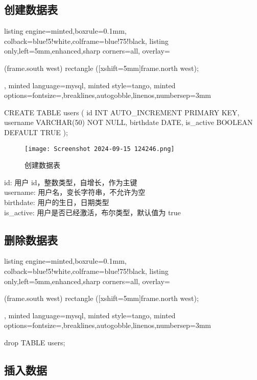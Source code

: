 \documentclass[12pt]{article}
\begin{document}
\subsection{创建数据表}
\begin{tcblisting}{listing engine=minted,boxrule=0.1mm,
colback=blue!5!white,colframe=blue!75!black,
listing only,left=5mm,enhanced,sharp corners=all,
overlay={\begin{tcbclipinterior} (frame.south west)
rectangle ([xshift=5mm]frame.north west);\end{tcbclipinterior}},
minted language=mysql,
minted style=tango,
minted options={fontsize=\small,breaklines,autogobble,linenos,numbersep=3mm}}
CREATE TABLE users (
    id INT AUTO_INCREMENT PRIMARY KEY,
    username VARCHAR(50) NOT NULL,
    birthdate DATE,
    is_active BOOLEAN DEFAULT TRUE
);
\end{tcblisting}
\begin{figure}[htbp]
    \centering
    \texttt{[image: Screenshot 2024-09-15 124246.png]}
    \caption{创建数据表}
    \label{fig:enter-label}
\end{figure}
{\songti 
id: 用户 id，整数类型，自增长，作为主键 \\
username: 用户名，变长字符串，不允许为空 \\
birthdate: 用户的生日，日期类型 \\
is\_active: 用户是否已经激活，布尔类型，默认值为 true \\
}
\subsection{删除数据表}
\begin{tcblisting}{listing engine=minted,boxrule=0.1mm,
colback=blue!5!white,colframe=blue!75!black,
listing only,left=5mm,enhanced,sharp corners=all,
overlay={\begin{tcbclipinterior} (frame.south west)
rectangle ([xshift=5mm]frame.north west);\end{tcbclipinterior}},
minted language=mysql,
minted style=tango,
minted options={fontsize=\small,breaklines,autogobble,linenos,numbersep=3mm}}
drop TABLE users;
\end{tcblisting}
\subsection{插入数据}
\end{document}
